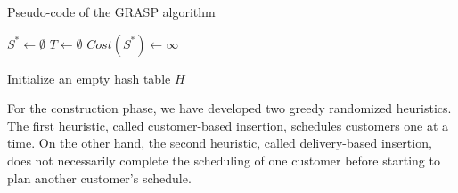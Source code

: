     {
        {\small
            \begin{algorithm}[hbpt]
                \caption{Pseudo-code of the GRASP algorithm }
                \label{alg_grasp}
                \DontPrintSemicolon
                \LinesNumbered
                \setcounter{AlgoLine}{0}
                $S^* \leftarrow \emptyset$    \hspace{2mm} $T \leftarrow \emptyset$       $Cost(S^*) \leftarrow \infty$

                Initialize an empty hash table $H$



            \end{algorithm}}
    }

For the construction phase, we have developed two greedy randomized heuristics. The first heuristic, called customer-based insertion, schedules customers one at a time. On the other hand, the second heuristic, called delivery-based insertion, does not necessarily complete the scheduling of one customer before starting to plan another customer's schedule.

